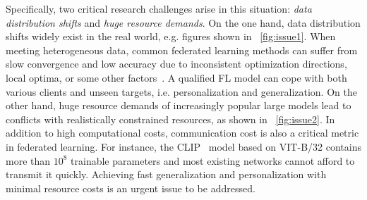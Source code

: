 \documentclass[11pt]{article}
\newcommand{\wjdd}[1]{\todo[linecolor=cyan,backgroundcolor=cyan!25,bordercolor=cyan,size=\scriptsize]{(WJD): #1}}
\begin{document}
Specifically, two critical research challenges arise in this situation: \emph{data distribution shifts} and \emph{huge resource demands}.
On the one hand, data distribution shifts widely exist in the real world, e.g. figures shown in \figurename~\ref{fig:issue1}.
When meeting heterogeneous data, common federated learning methods can suffer from slow convergence and low accuracy due to inconsistent optimization directions, local optima, or some other factors~\cite{Jindong-gao2022feddc}.
A qualified FL model can cope with both various clients and unseen targets, i.e. personalization and generalization.
On the other hand, huge resource demands of increasingly popular large models lead to conflicts with realistically constrained resources, as shown in \figurename~\ref{fig:issue2}.
In addition to high computational costs, communication cost is also a critical metric in federated learning.
For instance, the CLIP~\cite{Jindong-radford2021learning} model based on VIT-B/32 contains more than $10^8$ trainable parameters and most existing networks cannot afford to transmit it quickly.
Achieving fast generalization and personalization with minimal resource costs is an urgent issue to be addressed.

\end{document}
